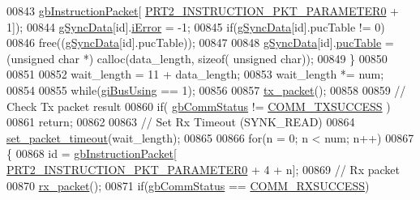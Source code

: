 \begin{DoxyCode}
00843                                                         \hyperlink{classdynamixel2_a298efe9115fdbf77019af1001e801fb4}{gbInstructionPacket}[
      \hyperlink{dynamixel_8h_a349ccb89ae957bdcc16856ec8e2dcb00}{PRT2\_INSTRUCTION\_PKT\_PARAMETER0} + 1]);
00844                 \hyperlink{classdynamixel2_a5923ec2418ab7ea83cbe365ad8b200d5}{gSyncData}[id].\hyperlink{structdynamixel2_1_1data_a1c974bc78558d2a55f9a7c647cbb36f5}{iError} = -1;
00845                 \textcolor{keywordflow}{if}(\hyperlink{classdynamixel2_a5923ec2418ab7ea83cbe365ad8b200d5}{gSyncData}[\textcolor{keywordtype}{id}].pucTable != 0)
00846                     free((\hyperlink{classdynamixel2_a5923ec2418ab7ea83cbe365ad8b200d5}{gSyncData}[\textcolor{keywordtype}{id}].pucTable));
00847 
00848                 \hyperlink{classdynamixel2_a5923ec2418ab7ea83cbe365ad8b200d5}{gSyncData}[id].\hyperlink{structdynamixel2_1_1data_ae06fa51258979434fbc9f0e128824950}{pucTable} = (\textcolor{keywordtype}{unsigned} \textcolor{keywordtype}{char} *) calloc(data\_length, \textcolor{keyword}{sizeof}(\textcolor{keywordtype}{
      unsigned} \textcolor{keywordtype}{char}));
00849             \}
00850 
00851 
00852             wait\_length  = 11 + data\_length;
00853             wait\_length *= num;
00854 
00855             \textcolor{keywordflow}{while}(\hyperlink{classdynamixel2_a7fc43b4c4b7e36aa8f0420b037658f83}{giBusUsing} == 1);
00856 
00857             \hyperlink{classdynamixel2_a526e395e15fbf50ffbc8ce0853b08233}{tx\_packet}();
00858 
00859             \textcolor{comment}{// Check Tx packet result}
00860             \textcolor{keywordflow}{if}( \hyperlink{classdynamixel2_a703e327ba8ec5909c238dc94a00cb32d}{gbCommStatus} != \hyperlink{dynamixel_8h_aac6d30f996256b24d311de81eb0f0c1e}{COMM\_TXSUCCESS} )
00861                 \textcolor{keywordflow}{return};
00862 
00863             \textcolor{comment}{// Set Rx Timeout (SYNK\_READ)}
00864             \hyperlink{classdynamixel2_a132d723a321ba225f75f2c79e5d4d27b}{set\_packet\_timeout}(wait\_length);
00865 
00866             \textcolor{keywordflow}{for}(n = 0; n < num; n++)
00867             \{
00868                 \textcolor{keywordtype}{id} = \hyperlink{classdynamixel2_a298efe9115fdbf77019af1001e801fb4}{gbInstructionPacket}[
      \hyperlink{dynamixel_8h_a349ccb89ae957bdcc16856ec8e2dcb00}{PRT2\_INSTRUCTION\_PKT\_PARAMETER0} + 4 + n];
00869                 \textcolor{comment}{// Rx packet}
00870                 \hyperlink{classdynamixel2_a7ca03821f030981263c55f2ae2786c4c}{rx\_packet}();
00871                 \textcolor{keywordflow}{if}(\hyperlink{classdynamixel2_a703e327ba8ec5909c238dc94a00cb32d}{gbCommStatus} == \hyperlink{dynamixel_8h_a171328d9f298535c18d079f65e631434}{COMM\_RXSUCCESS})

\end{DoxyCode}
